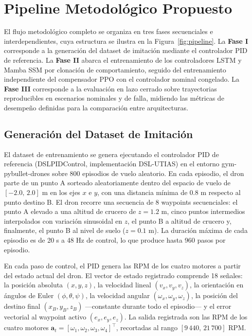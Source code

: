 


\section{Pipeline Metodológico Propuesto}

El flujo metodológico completo se organiza en tres fases secuenciales e interdependientes, cuya estructura se ilustra en la Figura~\ref{fig:pipeline}. La \textbf{Fase I} corresponde a la generación del dataset de imitación mediante el controlador PID de referencia. La \textbf{Fase II} abarca el entrenamiento de los controladores LSTM y Mamba SSM por clonación de comportamiento, seguido del entrenamiento independiente del compensador PPO con el controlador nominal congelado. La \textbf{Fase III} corresponde a la evaluación en lazo cerrado sobre trayectorias reproducibles en escenarios nominales y de falla, midiendo las métricas de desempeño definidas para la comparación entre arquitecturas.



\subsection{Generación del Dataset de Imitación}
\label{sec:datos}

El dataset de entrenamiento se genera ejecutando el controlador PID de referencia (DSLPIDControl, implementación DSL-UTIAS) en el entorno gym-pybullet-drones sobre 800 episodios de vuelo aleatorio. En cada episodio, el dron parte de un punto A sorteado aleatoriamente dentro del espacio de vuelo de $[-2.0,\, 2.0]$ m en los ejes $x$ e $y$, con una distancia mínima de 0.8 m respecto al punto destino B. El dron recorre una secuencia de 8 waypoints secuenciales: el punto A elevado a una altitud de crucero de $z = 1.2$ m, cinco puntos intermedios interpolados con variación sinusoidal en $z$, el punto B a altitud de crucero y, finalmente, el punto B al nivel de suelo ($z = 0.1$ m). La duración máxima de cada episodio es de 20 s a 48 Hz de control, lo que produce hasta 960 pasos por episodio.

En cada paso de control, el PID genera las RPM de los cuatro motores a partir del estado actual del dron. El vector de estado registrado comprende 18 señales: la posición absoluta $(x,y,z)$, la velocidad lineal $(v_x,v_y,v_z)$, la orientación en ángulos de Euler $(\phi,\theta,\psi)$, la velocidad angular $(\omega_x,\omega_y,\omega_z)$, la posición del destino final $(x_B,y_B,z_B)$ —constante durante todo el episodio— y el error vectorial al waypoint activo $(e_x,e_y,e_z)$. La salida registrada son las RPM de los cuatro motores $\mathbf{a}_t = [\omega_1,\omega_2,\omega_3,\omega_4]^\top$, recortadas al rango $[9\,440,\, 21\,700]$ RPM.

